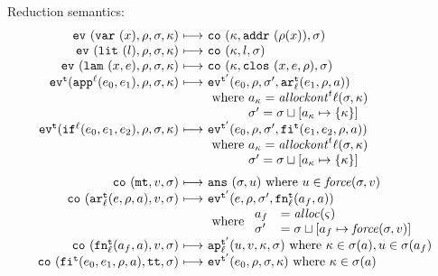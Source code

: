 \documentclass{llncs}
\begin{document}
Reduction semantics:
\begin{gather*}
\begin{array}{@{}r@{\ }c@{\ }l@{}}
\ev{\svar\mvar,\menv,\msto,\mkont} &\machstep&
\co{\mkont, \spchoice{\saddr{\menv(\mvar)}}{\superposition{\msto(\menv(\mvar))}},\msto}
\\
\ev{\slit\mlit,\menv,\msto,\mkont} &\machstep&
\co{\mkont,\mlit,\msto}
\\
\ev{\slam\mvar\mexp,\menv,\msto,\mkont} &\machstep&
\co{\mkont,\clos{\mvar,\mexp,\menv},\msto}
\\
\ev[^\mcntr]{\sapp[^\mlab]{\mexpi0}{\mexpi1},\menv,\msto,\mkont} &\machstep&
\ev[^{\mcntr'}]{\mexpi{0},\menv,\msto',\kar[_\mlab^\mcntr]{\mexpi{1},\menv,\maddr}}
\\
&&
\text{ where }\maddr_\mkont = \allockont^\mcntr\mlab(\msto,\mkont) \\
&&\phantom{\text{ where }}\msto' = \msto\sqcup[\maddr_\mkont \mapsto \setof{\mkont}]
\\
\ev[^\mcntr]{\sif[^\mlab]{\mexpi0}{\mexpi1}{\mexpi2},\menv,\msto,\mkont} &\machstep&
\ev[^{\mcntr'}]{\mexpi0,\menv,\msto',\kif[^\mcntr]{\mexpi1,\mexpi2,\menv,\maddr}}
\\
&&
\text{ where }\maddr_\mkont = \allockont^\mcntr\mlab(\msto,\mkont) \\
&&\phantom{\text{ where }}\msto' = \msto\sqcup[\maddr_\mkont \mapsto \setof{\mkont}]
\\[2mm]
\co{\kmt,\mval,\msto} &\machstep&
\ans{\msto,\mvalx{u}}
\text{ where } \mvalx{u} \in \spchoice{\force(\msto, \mval)}{\force(\mval)}
\\
\co{\kar[^\mcntr_\mlab]{\mexp,\menv,\maddr},\mval,\msto} & \machstep&
\ev[^{\mcntr'}]{\mexp,\menv,\msto',\kfn[^\mcntr_\mlab]{\maddr_f,\maddr}}
\\
&&
\text{ where }
\begin{array}{ll}
 \maddr_f &= \alloc(\mstate)\\
 \msto' &= \msto\sqcup[\maddr_f\mapsto\spchoice{\force(\msto,\mval)}{\force(\mval)}]
\end{array}
\\
\co{\kfn[^\mcntr_\mlab]{\maddr_f,\maddr},\mval,\msto} & \machstep&
\ap[^{\mcntr'}_\mlab]{\mvalx{u},\mval,\mkont,\msto}
\text{ where } \mkont \in \msto(\maddr), \mvalx{u} \in \msto(\maddr_f)
\\
\co{\kif[^\mcntr]{\mexpi0,\mexpi1,\menv,\maddr},\strue,\msto} & \machstep&
\ev[^{\mcntr'}]{\mexpi0,\menv,\msto,\mkont}
\text{ where }\mkont\in\msto(\maddr)
\\

\end{array}
\end{gather*}
\end{document}
